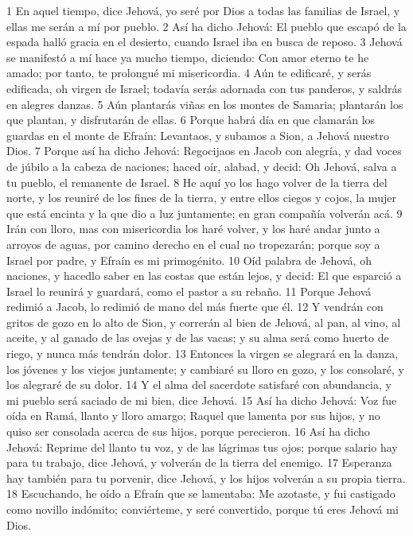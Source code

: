 1 En aquel tiempo, dice Jehová, yo seré por Dios a todas las familias de Israel, y ellas me serán a mí por pueblo.
2 Así ha dicho Jehová: El pueblo que escapó de la espada halló gracia en el desierto, cuando Israel iba en busca de reposo.
3 Jehová se manifestó a mí hace ya mucho tiempo, diciendo: Con amor eterno te he amado; por tanto, te prolongué mi misericordia.
4 Aún te edificaré, y serás edificada, oh virgen de Israel; todavía serás adornada con tus panderos, y saldrás en alegres danzas.
5 Aún plantarás viñas en los montes de Samaria; plantarán los que plantan, y disfrutarán de ellas.
6 Porque habrá día en que clamarán los guardas en el monte de Efraín: Levantaos, y subamos a Sion, a Jehová nuestro Dios.
7 Porque así ha dicho Jehová: Regocijaos en Jacob con alegría, y dad voces de júbilo a la cabeza de naciones; haced oír, alabad, y decid: Oh Jehová, salva a tu pueblo, el remanente de Israel.
8 He aquí yo los hago volver de la tierra del norte, y los reuniré de los fines de la tierra, y entre ellos ciegos y cojos, la mujer que está encinta y la que dio a luz juntamente; en gran compañía volverán acá.
9 Irán con lloro, mas con misericordia los haré volver, y los haré andar junto a arroyos de aguas, por camino derecho en el cual no tropezarán; porque soy a Israel por padre, y Efraín es mi primogénito.
10 Oíd palabra de Jehová, oh naciones, y hacedlo saber en las costas que están lejos, y decid: El que esparció a Israel lo reunirá y guardará, como el pastor a su rebaño.
11 Porque Jehová redimió a Jacob, lo redimió de mano del más fuerte que él.
12 Y vendrán con gritos de gozo en lo alto de Sion, y correrán al bien de Jehová, al pan, al vino, al aceite, y al ganado de las ovejas y de las vacas; y su alma será como huerto de riego, y nunca más tendrán dolor.
13 Entonces la virgen se alegrará en la danza, los jóvenes y los viejos juntamente; y cambiaré su lloro en gozo, y los consolaré, y los alegraré de su dolor.
14 Y el alma del sacerdote satisfaré con abundancia, y mi pueblo será saciado de mi bien, dice Jehová.
15 Así ha dicho Jehová: Voz fue oída en Ramá, llanto y lloro amargo; Raquel que lamenta por sus hijos, y no quiso ser consolada acerca de sus hijos, porque perecieron. 
16 Así ha dicho Jehová: Reprime del llanto tu voz, y de las lágrimas tus ojos; porque salario hay para tu trabajo, dice Jehová, y volverán de la tierra del enemigo.
17 Esperanza hay también para tu porvenir, dice Jehová, y los hijos volverán a su propia tierra.
18 Escuchando, he oído a Efraín que se lamentaba: Me azotaste, y fui castigado como novillo indómito; conviérteme, y seré convertido, porque tú eres Jehová mi Dios.
